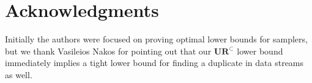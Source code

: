 \documentclass[11pt]{article}
\newcommand{\ur}{\mathbf{UR}\xspace}
\begin{document}
\newpage


%



\section*{Acknowledgments}
Initially the authors were focused on proving optimal lower bounds for samplers, but we thank Vasileios Nakos for pointing out that our $\ur^\subset$ lower bound immediately implies a tight lower bound for finding a duplicate in data streams as well.




\appendix


\end{document}

